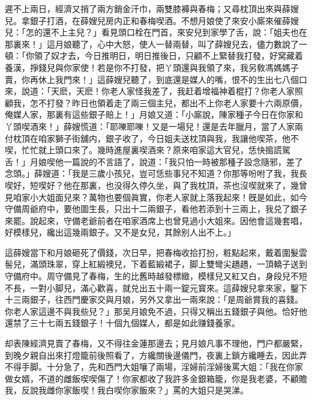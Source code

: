 遲不上兩日，經濟又捎了兩方銷金汗巾，兩雙膝褲與春梅；又尋枕頂出來與薛嫂兒。拿銀子打酒，在薛嫂兒房内正和春梅喫酒。不想月娘使了來安小廝來催薛嫂兒：「怎的還不上主兒？」看見頭口栓在門首，來安兒到家學了舌，說：「姐夫也在那裏來！」這月娘聽了，心中大怒，使人一替兩替，叫了薛嫂兒去，儘力數說了一頓：「你領了奴才去，今日推明日，明日推後日，只顧不上緊替我打發，好窝藏着養漢，掙錢兒與你家使！若是你不打發，把丫頭還與我領了來，我另敎馮媽媽子賣，你再休上我門來！」這薛嫂兒聽了，到底還是媒人的嘴，恨不的生出七八個口來，說道：「天麽，天麽！你老人家怪我差了，我赶着增福神着棍打？你老人家照顧我，怎不打發？昨日也領着走了兩三個主兒，都出不上你老人家要十六兩原價，俺媒人家，那裏有這些銀子賠上！」月娘又道：「小廝說，陳家種子今日在你家和丫頭喫酒來！」薛嫂慌道：「耶嚛耶嚛！又是一場兒！還是去年臘月，當了人家兩付枕頂在咱家獅子街舖内，銀子收了，今日姐夫送枕頂與我，我讓他喫茶，他不喫，忙忙就上頭口來了。幾時進屋裏喫酒來？原來咱家這大官兒，恁快搗謊駕舌！」月娘喫他一篇說的不言語了，說道：「我只怕一時被那種子設念隨邪，差了念頭。」薛嫂道：「我是三歲小孩兒，豈可恁些事兒不知道？你那等吩咐了我，我長喫好，短喫好？他在那裏，也没得久停久坐，與了我枕頂，茶也沒喫就來了，幾曾見咱家小大姐面兒來？萬物也要個眞實，你老人家就上落我起來！旣是如此，如今守備周爺府中，要他圖生長，只出十二兩銀子，看他若添到十三兩上，我兑了銀子來罷。說起來，守備老爺前者在咱家酒席上也曾見過小大姐來。因他會這幾套唱，好模樣兒，纔出這幾兩銀子。又不是女兒，其餘别人出不上。」

這薛嫂當下和月娘砸死了價錢，次日早，把春梅收拾打扮，粧點起來，戴着圍髮雲髻兒，滿頭珠翠，穿上紅緞襖兒，下着藍緞裙子，脚上雙彎尖趫趫，一頂轎子送到守備府中。周守備見了春梅，生的比舊時越發標緻，模樣兒又紅又白，身段兒不短不長，一對小脚兒，滿心歡喜，就兑出五十兩一錠元寳來。這薛嫂兒拿來家，鑿下十三兩銀子，往西門慶家交與月娘，另外又拿出一兩來說：「是周爺賞我的喜錢。你老人家這邊不與我些兒？」那吴月娘免不過，只得又稱出五錢銀子與他。恰好他還禁了三十七兩五錢銀子！十個九個媒人，都是如此赚錢養家。

却表陳經濟見賣了春梅，又不得往金蓮那邊去；見月娘凡事不理他，門户都嚴緊，到晚夕親自出來打燈籠前後照看了，方纔關後邊儀門，夜裏上鎖方纔睡去，因此弄不得手脚。十分急了，先和西門大姐嚷了兩場，淫婦前淫婦後罵大姐：「我在你家做女婿，不道的雌飯喫喫傷了！你家都收了我許多金銀箱籠，你是我老婆，不顧贍我，反說我雌你家飯喫！我白喫你家飯來？」罵的大姐只是哭涕。

